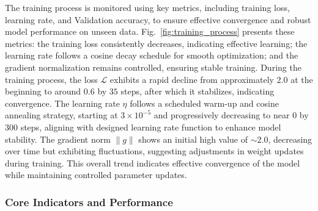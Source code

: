 The training process is monitored using key metrics, including training loss, learning rate, and Validation accuracy, to ensure effective convergence and robust model performance on unseen data. Fig.~\ref{fig:training_process} presents these metrics: the training loss consistently decreases, indicating effective learning; the learning rate follows a cosine decay schedule for smooth optimization; and the gradient normalization remains controlled, ensuring stable training.
During the training process, the loss $\mathcal{L}$ exhibits a rapid decline from approximately $2.0$ at the beginning to around $0.6$ by $35$ steps, after which it stabilizes, indicating convergence. The learning rate $\eta$ follows a scheduled warm-up and cosine annealing strategy, starting at $3 \times 10^{-5}$ and progressively decreasing to near $0$ by $300$ steps, aligning with designed learning rate function to enhance model stability. The gradient norm $\|g\|$ shows an initial high value of $\sim2.0$, decreasing over time but exhibiting fluctuations, suggesting adjustments in weight updates during training. This overall trend indicates effective convergence of the model while maintaining controlled parameter updates.








\subsubsection{Core Indicators and Performance}

